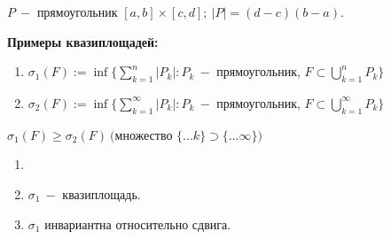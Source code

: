 \begin{designation}
    $P\ -$ прямоугольник $[a,b]\times[c,d];\ |P|=(d-c)(b-a)$.
\end{designation}

\begin{example}
    \textbf{Примеры квазиплощадей:}
     \begin{enumerate}
         \item $\sigma_1(F):=\inf \{\sum\limits_{k=1}^n|P_k|:P_k\ - $ прямоугольник, $F\subset \bigcup_{k=1}^n P_k \}$ 
         \item $\sigma_2(F):=\inf \{\sum\limits_{k=1}^\infty|P_k|:P_k\ - $ прямоугольник, $F\subset \bigcup_{k=1}^\infty P_k \}$ 
     \end{enumerate}
\end{example}

\begin{remark}
     $\sigma_1(F)\geq \sigma_2(F)\ ($множество $\{...k\}\supset\{...\infty\})$
\end{remark}

\begin{theorem}
    \begin{enumerate}
        \item[]
        \item $\sigma_1\ -$ квазиплощадь.
        \item $\sigma_1$ инвариантна относительно сдвига.
    \end{enumerate}
\end{theorem}

